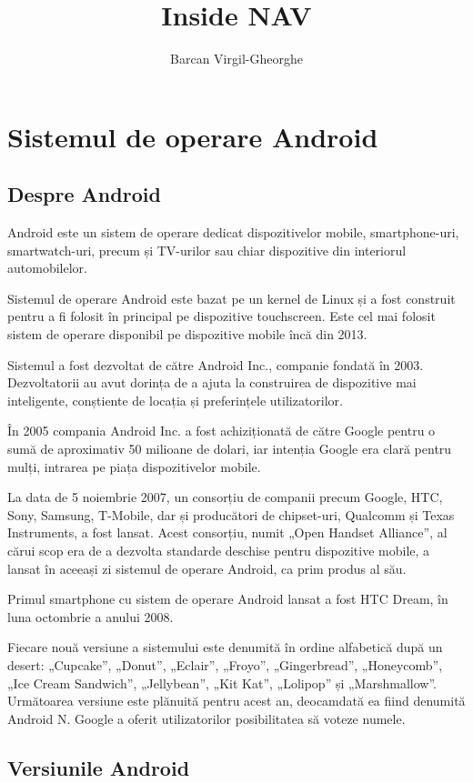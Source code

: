 \documentclass[12pt,a4paper]{article}
\title{Inside NAV}
\author{Barcan Virgil-Gheorghe}
\begin{document}
\maketitle


\section{Sistemul de operare Android}
\subsection{Despre Android}
Android este un sistem de operare dedicat dispozitivelor mobile, smartphone-uri, smartwatch-uri, precum și TV-urilor sau chiar dispozitive din interiorul automobilelor.

Sistemul de operare Android este bazat pe un kernel de Linux și a fost construit pentru a fi folosit în principal pe dispozitive touchscreen. Este cel mai folosit sistem de operare disponibil pe dispozitive mobile încă din 2013.

Sistemul a fost dezvoltat de către Android Inc., companie fondată în 2003. Dezvoltatorii au avut dorința de a ajuta la construirea de dispozitive mai inteligente, conștiente de locația și preferințele utilizatorilor.

În 2005 compania Android Inc. a fost achiziționată de către Google pentru o sumă de aproximativ 50 milioane de dolari, iar intenția Google era clară pentru mulți, intrarea pe piața dispozitivelor mobile.

La data de 5 noiembrie 2007, un consorțiu de companii precum Google, HTC, Sony, Samsung, T-Mobile, dar și producători de chipset-uri, Qualcomm și Texas Instruments, a fost lansat. Acest consorțiu, numit „Open Handset Alliance”, al cărui scop era de a dezvolta standarde deschise pentru dispozitive mobile, a lansat în aceeași zi sistemul de operare Android, ca prim produs al său.

Primul smartphone cu sistem de operare Android lansat a fost HTC Dream, în luna octombrie a anului 2008.

Fiecare nouă versiune a sistemului este denumită în ordine alfabetică după un desert: „Cupcake”, „Donut”, „Eclair”, „Froyo”, „Gingerbread”, „Honeycomb”, „Ice Cream Sandwich”, „Jellybean”, „Kit Kat”, „Lolipop” și „Marshmallow”. Următoarea versiune este plănuită pentru acest an, deocamdată ea fiind denumită Android N. Google a oferit utilizatorilor posibilitatea să voteze numele.


\subsection{Versiunile Android}
\end{document}
